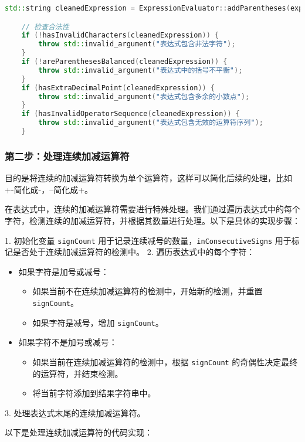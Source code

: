 \documentclass[UTF8]{ctexart}
\begin{document}
\begin{lstlisting}[language=c++, breaklines=true]
    std::string cleanedExpression = ExpressionEvaluator::addParentheses(expression);

    // 检查合法性
    if (!hasInvalidCharacters(cleanedExpression)) {
        throw std::invalid_argument("表达式包含非法字符");
    }
    if (!areParenthesesBalanced(cleanedExpression)) {
        throw std::invalid_argument("表达式中的括号不平衡");
    }
    if (hasExtraDecimalPoint(cleanedExpression)) {
        throw std::invalid_argument("表达式包含多余的小数点");
    }
    if (hasInvalidOperatorSequence(cleanedExpression)) {
        throw std::invalid_argument("表达式包含无效的运算符序列");
    }
\end{lstlisting}

\subsubsection{第二步：处理连续加减运算符}

目的是将连续的加减运算符转换为单个运算符，这样可以简化后续的处理，比如+-简化成-，--简化成+。

在表达式中，连续的加减运算符需要进行特殊处理。我们通过遍历表达式中的每个字符，检测连续的加减运算符，并根据其数量进行处理。以下是具体的实现步骤：

1. 初始化变量 \texttt{signCount} 用于记录连续减号的数量，\texttt{inConsecutiveSigns} 用于标记是否处于连续加减运算符的检测中。
2. 遍历表达式中的每个字符：
   \begin{itemize}
     \item 如果字符是加号或减号：
       \begin{itemize}
         \item 如果当前不在连续加减运算符的检测中，开始新的检测，并重置 \texttt{signCount}。
         \item 如果字符是减号，增加 \texttt{signCount}。
       \end{itemize}
     \item 如果字符不是加号或减号：
       \begin{itemize}
         \item 如果当前在连续加减运算符的检测中，根据 \texttt{signCount} 的奇偶性决定最终的运算符，并结束检测。
         \item 将当前字符添加到结果字符串中。
       \end{itemize}
   \end{itemize}
3. 处理表达式末尾的连续加减运算符。

以下是处理连续加减运算符的代码实现：
\end{document}
